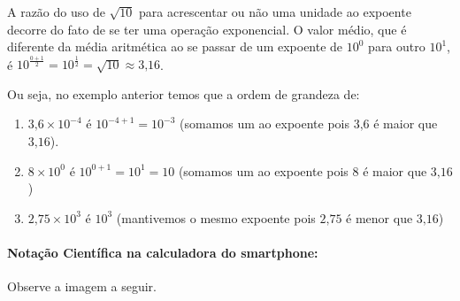 A razão do uso de $\sqrt{10}$ para acrescentar ou não uma unidade ao expoente decorre do fato de se ter uma operação exponencial. O valor médio, que é diferente da média aritmética ao se passar de um expoente de $10^0$ para outro $10^1$, é ${10}^\frac{0+1}{2}{=10}^\frac{1}{2}=\sqrt{10} \approx 3\text{,}16$.

\begin{example}{}

Ou seja, no exemplo anterior temos que a ordem de grandeza de:
\begin{enumerate}
\item {} 
$3\text{,}6 \times 10^{-4}$  é  $10^{-4+1} = 10^{-3}$ (somamos um ao expoente pois $3\text{,}6$ é maior que $3\text{,}16$).

\item {} 
$8 \times 10^0$ é  $10^{0+1} = 10^1 = 10$ (somamos um ao expoente pois $8$ é maior que $3\text{,}16$)

\item {} 
$2\text{,}75 \times 10^3$ é $10^3$  (mantivemos o mesmo expoente pois $2\text{,}75$ é menor que $3\text{,}16$)

\end{enumerate}
\end{example}

\paragraph{Notação Científica na calculadora do smartphone:}

Observe a imagem a seguir.

